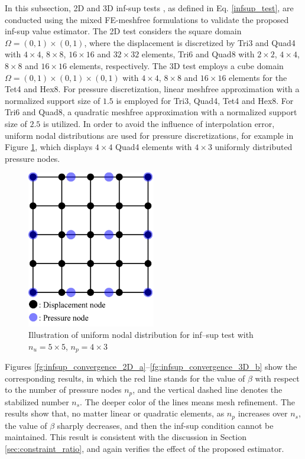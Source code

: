 In this subsection, 2D and 3D inf-sup tests \cite{chapelle1993}, as defined in Eq. \ref{infsup_test}, are conducted using the mixed FE-meshfree formulations to validate the proposed inf-sup value estimator.
The 2D test considers the square domain $\Omega = (0,1)\times (0,1)$, where the displacement is discretized by Tri3 and Quad4 with $4\times 4$, $8\times 8$, $16\times 16$ and $32\times 32$ elements, Tri6 and Quad8 with $2\times 2$, $4\times 4$, $8\times 8$ and $16\times 16$ elements, respectively. The 3D test employs a cube domain $\Omega = (0,1)\times (0,1)\times (0,1)$ with $4\times 4$, $8\times 8$ and $16\times 16$ elements for the Tet4 and Hex8.
For pressure discretization, linear meshfree approximation with a normalized support size of $1.5$ is employed for Tri3, Quad4, Tet4 and Hex8.
For Tri6 and Quad8, a quadratic meshfree approximation with a normalized support size of $2.5$ is utilized.
In order to avoid the influence of interpolation error, uniform nodal distributions are used for pressure discretizations, for example in Figure \ref{fg:infsup_mesh}, which displays $4\times4$ Quad4 elements with $4\times3$ uniformly distributed pressure nodes.

\begin{figure}[H]
\centering
\includegraphics[width=0.5\textwidth]{pdf/infsup_mesh.pdf}
\caption{Illustration of uniform nodal distribution for inf--sup test with $n_u=5\times5$, $n_p=4\times3$}\label{fg:infsup_mesh}
\end{figure}

Figures \ref{fg:infsup_convergence_2D_a}--\ref{fg:infsup_convergence_3D_b} show the corresponding results, in which the red line stands for the value of $\beta$ with respect to the number of pressure nodes $n_p$, and the vertical dashed line denotes the stabilized number $n_s$. The deeper color of the lines means mesh refinement. The results show that, no matter linear or quadratic elements, as $n_p$ increases over $n_s$, the value of $\beta$ sharply decreases, and then the inf-sup condition cannot be maintained. This result is consistent with the discussion in Section \ref{sec:constraint_ratio}, and again verifies the effect of the proposed estimator.

